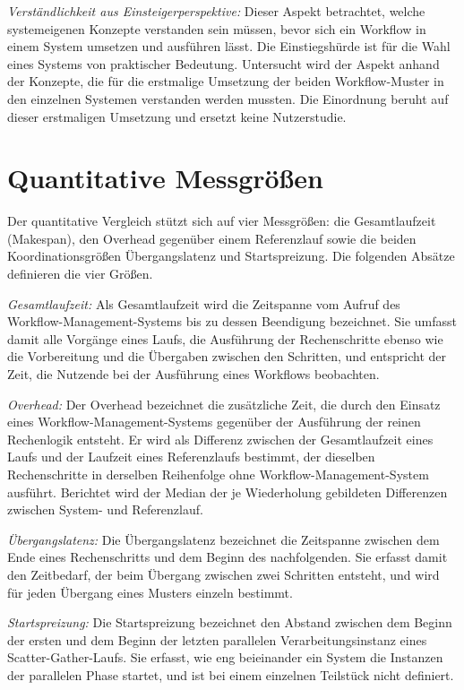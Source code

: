 \emph{Verständlichkeit aus Einsteigerperspektive:} Dieser Aspekt
betrachtet, welche systemeigenen Konzepte verstanden sein müssen,
bevor sich ein Workflow in einem System umsetzen und ausführen
lässt. Die Einstiegshürde ist für die Wahl eines Systems von
praktischer Bedeutung.  Untersucht wird der Aspekt anhand der Konzepte, die für die erstmalige Umsetzung der beiden Workflow-Muster in den einzelnen Systemen verstanden werden mussten. Die Einordnung beruht auf dieser erstmaligen Umsetzung und ersetzt keine Nutzerstudie.


\section{Quantitative Messgrößen}
\label{sec:methodik:messgroessen}
Der quantitative Vergleich stützt sich auf vier Messgrößen: die Gesamtlaufzeit (Makespan), den Overhead gegenüber einem Referenzlauf sowie die beiden Koordinationsgrößen Übergangslatenz und Startspreizung. Die folgenden Absätze definieren die vier
Größen.

\emph{Gesamtlaufzeit:} Als Gesamtlaufzeit wird die Zeitspanne vom
Aufruf des Workflow-Management-Systems bis zu dessen Beendigung
bezeichnet. Sie umfasst damit alle Vorgänge eines Laufs, die
Ausführung der Rechenschritte ebenso wie die Vorbereitung und die
Übergaben zwischen den Schritten, und entspricht der Zeit, die
Nutzende bei der Ausführung eines Workflows beobachten.

\emph{Overhead:} Der Overhead bezeichnet die zusätzliche Zeit, die durch den Einsatz eines Workflow-Management-Systems gegenüber der Ausführung der reinen Rechenlogik entsteht. Er wird als Differenz zwischen der Gesamtlaufzeit eines Laufs und der Laufzeit eines Referenzlaufs bestimmt, der dieselben Rechenschritte in derselben Reihenfolge ohne Workflow-Management-System ausführt. Berichtet wird der Median der je Wiederholung gebildeten
Differenzen zwischen System- und Referenzlauf.

\emph{Übergangslatenz:} Die Übergangslatenz bezeichnet die
Zeitspanne zwischen dem Ende eines Rechenschritts und dem Beginn des
nachfolgenden. Sie erfasst damit den Zeitbedarf, der beim Übergang
zwischen zwei Schritten entsteht, und wird für jeden Übergang eines
Musters einzeln bestimmt.

\emph{Startspreizung:} Die Startspreizung bezeichnet den Abstand
zwischen dem Beginn der ersten und dem Beginn der letzten parallelen
Verarbeitungsinstanz eines Scatter-Gather-Laufs. Sie erfasst, wie
eng beieinander ein System die Instanzen der parallelen Phase startet,
und ist bei einem einzelnen Teilstück nicht definiert.

